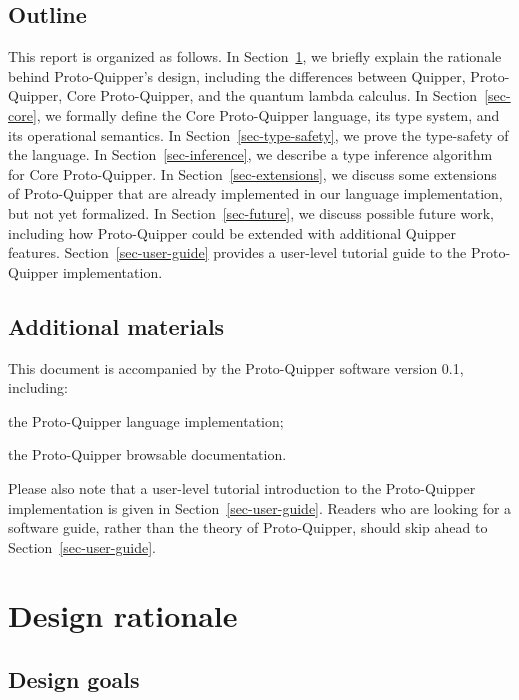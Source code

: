\documentclass[twoside]{article}
\begin{document}
\subsection{Outline}

This report is organized as follows. In Section~\ref{sec-design}, we
briefly explain the rationale behind Proto-Quipper's design, including
the differences between Quipper, Proto-Quipper, Core Proto-Quipper,
and the quantum lambda calculus. In Section~\ref{sec-core}, we
formally define the Core Proto-Quipper language, its type system, and
its operational semantics. In Section~\ref{sec-type-safety}, we prove
the type-safety of the language. In Section~\ref{sec-inference}, we
describe a type inference algorithm for Core Proto-Quipper. In
Section~\ref{sec-extensions}, we discuss some extensions of
Proto-Quipper that are already implemented in our language
implementation, but not yet formalized. In Section~\ref{sec-future},
we discuss possible future work, including how Proto-Quipper could be
extended with additional Quipper features.
Section~\ref{sec-user-guide} provides a user-level tutorial guide to
the Proto-Quipper implementation.

\subsection{Additional materials}

This document is accompanied by the Proto-Quipper software version
0.1, including:
\begin{compactitemize}
\item the Proto-Quipper language implementation;
\item the Proto-Quipper browsable documentation.
\end{compactitemize}

Please also note that a user-level tutorial introduction to the
Proto-Quipper implementation is given in
Section~\ref{sec-user-guide}. Readers who are looking for a software
guide, rather than the theory of Proto-Quipper, should skip ahead to
Section~\ref{sec-user-guide}.

\clearpage
\section{Design rationale}\label{sec-design}

\subsection{Design goals}
\end{document}
